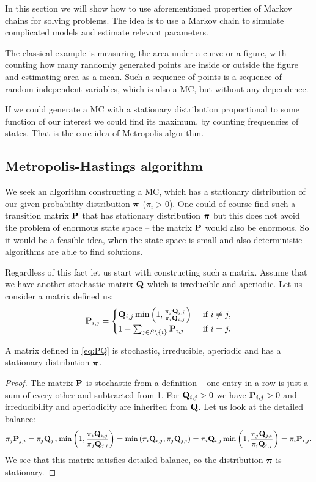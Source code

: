 In this section we will show how to use aforementioned properties of Markov chains for solving problems. The idea is to use a Markov chain to simulate complicated models and estimate relevant parameters.

The classical example is measuring the area under a curve or a figure, with counting how many randomly generated points are inside or outside the figure and estimating area as a mean. Such a sequence of points is a sequence of random independent variables, which is also a MC, but without any dependence.

If we could generate a MC with a stationary distribution proportional to some function of our interest we could find its maximum, by counting frequencies of states. That is the core idea of Metropolis algorithm.

\subsection{Metropolis-Hastings algorithm}
	We seek an algorithm constructing a MC, which has a stationary distribution of our given probability distribution $\boldsymbol{\pi}$ ($\pi_i > 0$). One could of course find such a transition matrix $\mathbf{P}$ that has stationary distribution $\boldsymbol{\pi}$ but this does not avoid the problem of enormous state space -- the matrix $\mathbf{P}$ would also be enormous. So it would be a feasible idea, when the state space is small and also deterministic algorithms are able to find solutions. 
	
	Regardless of this fact let us start with constructing such a matrix. Assume that we have another stochastic matrix $\mathbf{Q}$ which is irreducible and aperiodic. Let us consider a matrix defined us:
	\begin{equation} \label{eq:PQ}
		\mathbf{P}_{i,j} = 
		\begin{cases}
		\mathbf{Q}_{i,j} \min \left(1, \frac{\pi_j \mathbf{Q}_{j,i}}{\pi_i \mathbf{Q}_{i,j}}\right) & \text{ if } i \neq j, \\ 
		1 - \sum_{j \in S \setminus \left\{ i \right\} } \mathbf{P}_{i,j}& \text{ if } i = j.
		\end{cases}
	\end{equation} 
	
	\begin{theorem}
		A matrix defined in \ref{eq:PQ} is stochastic, irreducible, aperiodic and has a stationary distribution $\boldsymbol{\pi}$.
	\end{theorem}
	\begin{proof}
		The matrix $\mathbf{P}$ is stochastic from a definition -- one entry in a row is just a sum of every other and subtracted from 1. For $\mathbf{Q}_{i,j} > 0$ we have $\mathbf{P}_{i,j} > 0$ and irreducibility and aperiodicity are inherited from $\mathbf{Q}$. Let us look at the detailed balance:
		\begin{equation*}
			\pi_j \mathbf{P}_{j,i} = \pi_j \mathbf{Q}_{j,i} \min \left(1, \frac{\pi_i \mathbf{Q}_{i,j}}{\pi_j \mathbf{Q}_{j,i}}\right) = \min \left(\pi_i \mathbf{Q}_{i,j}, \pi_j \mathbf{Q}_{j,i} \right) =  \pi_i \mathbf{Q}_{i,j} \min \left(1, \frac{\pi_j \mathbf{Q}_{j,i}}{\pi_i \mathbf{Q}_{i,j}}\right) = \pi_i \mathbf{P}_{i,j}.
		\end{equation*}
		We see that this matrix satisfies detailed balance, co the distribution $\boldsymbol{\pi}$ is stationary.
	\end{proof}
	
